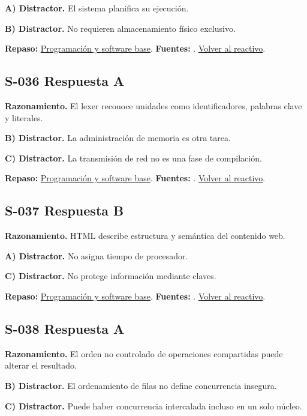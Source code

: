 \textbf{A) Distractor. }El sistema planifica su ejecución.

\textbf{B) Distractor. }No requieren almacenamiento físico exclusivo.

\textbf{Repaso:} \hyperref[sec:s2]{Programación y software base}. \textbf{Fuentes:} \cite{ostep,cppreference,compiler}. \hyperref[q:S-035]{Volver al reactivo}.\par\medskip

\subsection*{S-036 \quad Respuesta A}\label{s:S-036}
\textbf{Razonamiento.} El lexer reconoce unidades como identificadores, palabras clave y literales.

\textbf{B) Distractor. }La administración de memoria es otra tarea.

\textbf{C) Distractor. }La transmisión de red no es una fase de compilación.

\textbf{Repaso:} \hyperref[sec:s2]{Programación y software base}. \textbf{Fuentes:} \cite{ostep,cppreference,compiler}. \hyperref[q:S-036]{Volver al reactivo}.\par\medskip

\subsection*{S-037 \quad Respuesta B}\label{s:S-037}
\textbf{Razonamiento.} HTML describe estructura y semántica del contenido web.

\textbf{A) Distractor. }No asigna tiempo de procesador.

\textbf{C) Distractor. }No protege información mediante claves.

\textbf{Repaso:} \hyperref[sec:s2]{Programación y software base}. \textbf{Fuentes:} \cite{ostep,cppreference,compiler}. \hyperref[q:S-037]{Volver al reactivo}.\par\medskip

\subsection*{S-038 \quad Respuesta A}\label{s:S-038}
\textbf{Razonamiento.} El orden no controlado de operaciones compartidas puede alterar el resultado.

\textbf{B) Distractor. }El ordenamiento de filas no define concurrencia insegura.

\textbf{C) Distractor. }Puede haber concurrencia intercalada incluso en un solo núcleo.


